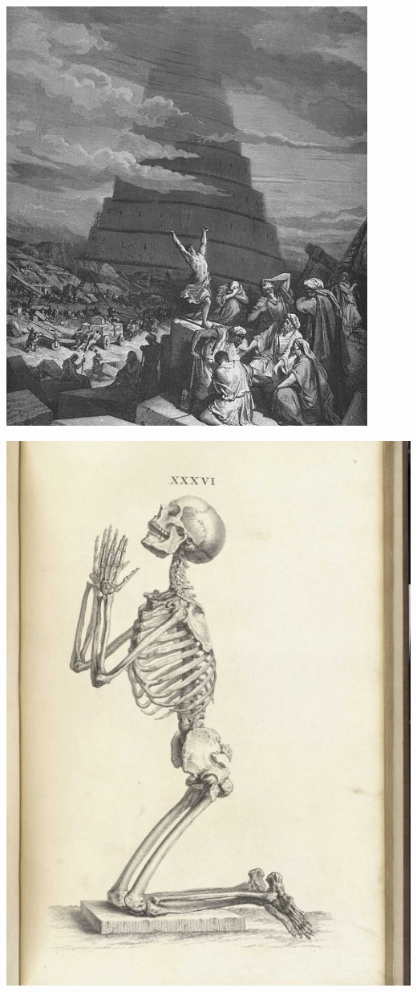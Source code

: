 \documentclass{mediumfoils}
\begin{document}
\newpage 
\centerline{\includegraphics[scale=1]{pictures/confusionoftongues.png}}



\newpage

\centerline{\includegraphics[scale=.7]{pictures/praying-skeleton}}
\end{document}
